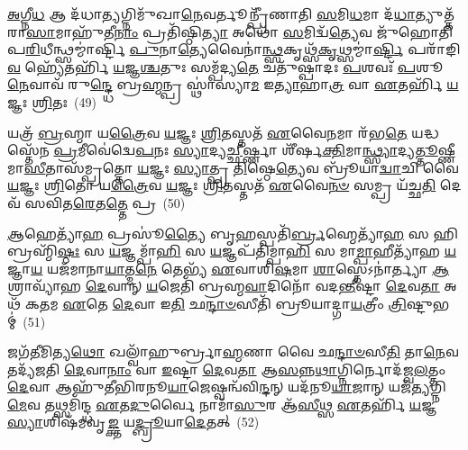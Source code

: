 {\anuvakamend[{\-\ul{𑌪𑍍𑌰𑌾}\-\-\ul{𑌶𑍍𑌞𑍀}\-𑌯𑌾𑌦𑍍𑌧𑍋𑌤𑌾᳴ \ul{𑌯}\-𑌜𑍍𑌞𑌂 𑌨𑌿𑌰᳴𑌹\-\ul{𑌰}\-𑌨𑍍𑌤𑌚𑍍𑌚𑌕𑍍𑌷𑍁᳴\-\ul{𑌰𑌾}\-𑌸𑍍𑌯᳴𑌙𑍍𑌕𑌿𑌂 \ul{𑌚}\-𑌨 \ul{𑌹𑌿}\-𑌨\-\ul{𑌸𑍍𑌤𑌿} 𑌸𑍋᳴\-𑌽𑌬𑌿\-\ul{𑌭𑍇}\-𑌚𑍍𑌚𑌤𑍁᳴𑌶𑍍𑌚𑌤𑍍𑌵𑌾𑌰𑌿𑍞𑌶𑌚𑍍𑌚}]}%

\-\ul{𑌅}\-𑌗𑍍𑌨𑍀\-\ul{𑌧} 𑌆 𑌦᳴𑌧𑌾\-\ul{𑌤𑍍𑌯}\-𑌗𑍍𑌨𑌿𑌮𑍁᳴𑌖𑌾\-\ul{𑌨𑍇}\-𑌵𑌰𑍍𑌤𑍂𑌨𑍍𑌪𑍍𑌰𑍀᳴𑌣𑌾𑌤𑌿 \ul{𑌸}\-𑌮𑌿\-\ul{𑌧}\-𑌮𑌾 𑌦᳴\-\ul{𑌧𑌾}\-𑌤𑍍𑌯𑍁𑌤𑍍𑌤᳴𑌰𑌾\-\ul{𑌸𑌾}\-𑌮𑌾𑌹𑍁᳴𑌤𑍀\-\ul{𑌨𑌾𑌂} 𑌪𑍍𑌰𑌤𑌿᳴𑌷𑍍𑌠𑌿\-\ul{𑌤𑍍𑌯𑌾} 𑌅𑌥𑍋᳴ \ul{𑌸}\-𑌮𑌿𑌦𑍍𑌵᳴\-\ul{𑌤𑍍𑌯𑍇}\-𑌵 𑌜𑍁᳴𑌹𑍋𑌤𑌿 𑌪\-\ul{𑌰𑌿}\-𑌧𑍀𑌨𑍍𑌥𑍍𑌸𑌮𑍍𑌮𑌾॑𑌰𑍍𑌷𑍍𑌟𑌿 \ul{𑌪𑍁}\-𑌨𑌾\-\ul{𑌤𑍍𑌯𑍇}\-𑌵𑍈𑌨𑌾॑\-\ul{𑌨𑍍𑌥𑍍𑌸}\-𑌕𑍃𑌥𑍍𑌸᳴\-\ul{𑌕𑍃}\-𑌥𑍍𑌸𑌮𑍍𑌮𑌾॑\-\ul{𑌰𑍍𑌷𑍍𑌟𑌿} 𑌪𑌰𑌾᳴𑌙𑌿\-\ul{𑌵} 𑌹𑍍𑌯𑍇᳴𑌤𑌰𑍍\mbox{}𑌹𑌿᳴ \ul{𑌯}\-𑌜𑍍𑌞\-\ul{𑌶𑍍𑌚}\-𑌤𑍁𑌃 𑌸𑌮𑍍𑌪᳴𑌦𑍍𑌯\-\ul{𑌤𑍇} 𑌚𑌤𑍁᳴𑌷𑍍𑌪𑌾𑌦𑌃 \ul{𑌪}\-𑌶𑌵𑌃᳴ \ul{𑌪}\-𑌶𑍂\-\ul{𑌨𑍇}\-𑌵𑌾𑌵᳴ 𑌰𑍁\-\ul{𑌨𑍍𑌦𑍍𑌧𑍇} 𑌬𑍍𑌰\-\ul{𑌹𑍍𑌮}\-𑌨𑍍𑌪𑍍𑌰 𑌸𑍍𑌥𑌾॑𑌸𑍍𑌯𑌾\-\ul{𑌮} 𑌇\-\ul{𑌤𑍍𑌯𑌾}\-𑌹𑌾\-\ul{𑌤𑍍𑌰} 𑌵𑌾 \ul{𑌏}\-𑌤𑌰𑍍\mbox{}𑌹𑌿᳴ \ul{𑌯}\-𑌜𑍍𑌞𑌃 \ul{𑌶𑍍𑌰𑌿}\-𑌤𑌃~(49)

𑌯𑌤𑍍𑌰᳴ \ul{𑌬𑍍𑌰}\-𑌹𑍍𑌮𑌾 𑌯\-\ul{𑌤𑍍𑌰𑍈}\-𑌵 \ul{𑌯}\-𑌜𑍍𑌞𑌃 \ul{𑌶𑍍𑌰𑌿}\-𑌤𑌸𑍍𑌤𑌤᳴ \ul{𑌏}\-𑌵𑍈\-\ul{𑌨}\-𑌮𑌾 𑌰᳴𑌭\-\ul{𑌤𑍇} 𑌯𑌦𑍍𑌧𑌸𑍍𑌤𑍇᳴𑌨 \ul{𑌪𑍍𑌰}\-𑌮𑍀𑌵𑍇॑𑌦𑍍𑌵𑍇\-\ul{𑌪}\-𑌨𑌃 \ul{𑌸𑍍𑌯𑌾}\-𑌦𑍍𑌯\-\ul{𑌚𑍍𑌛𑍀}\-𑌰𑍍𑌷𑍍𑌣𑌾 𑌶𑍀᳴𑌰𑍍\mbox{}𑌷\-\ul{𑌕𑍍𑌤𑌿}\-𑌮𑌾\-\ul{𑌨𑍍𑌥𑍍𑌸𑍍𑌯𑌾}\-𑌦𑍍𑌯\-\ul{𑌤𑍍𑌤𑍂}\-𑌷𑍍𑌣𑍀𑌮𑌾\-\ul{𑌸𑍀}\-𑌤𑌾𑌸᳴𑌮𑍍𑌪𑍍𑌰𑌤𑍍𑌤𑍋 \ul{𑌯}\-𑌜𑍍𑌞𑌃 \ul{𑌸𑍍𑌯𑌾}\-𑌤𑍍𑌪𑍍𑌰 \ul{𑌤𑌿}\-𑌷𑍍𑌠𑍇\-\ul{𑌤𑍍𑌯𑍇}\-𑌵 𑌬𑍍𑌰𑍂᳴𑌯𑌾\-\ul{𑌦𑍍𑌵𑌾}\-𑌚𑌿 𑌵𑍈 \ul{𑌯}\-𑌜𑍍𑌞𑌃 \ul{𑌶𑍍𑌰𑌿}\-𑌤𑍋 𑌯\-\ul{𑌤𑍍𑌰𑍈}\-𑌵 \ul{𑌯}\-𑌜𑍍𑌞𑌃 \ul{𑌶𑍍𑌰𑌿}\-𑌤𑌸𑍍𑌤𑌤᳴ \ul{𑌏}\-𑌵𑍈\-\ul{𑌨}\-\-\ul{𑍞} 𑌸𑌮𑍍𑌪𑍍𑌰 𑌯᳴𑌚𑍍𑌛\-\ul{𑌤𑌿} 𑌦𑍇𑌵᳴ 𑌸𑌵𑌿𑌤\-\ul{𑌰𑍇}\-𑌤\-\ul{𑌤𑍍𑌤𑍇} 𑌪𑍍𑌰~(50)

\-\ul{𑌆}\-𑌹𑍇𑌤𑍍𑌯𑌾᳴\-\ul{𑌹} 𑌪𑍍𑌰𑌸𑍂॑\-\ul{𑌤𑍍𑌯𑍈} 𑌬𑍃\-\ul{𑌹}\-𑌸𑍍𑌪𑌤𑌿᳴\-\ul{𑌰𑍍𑌬𑍍𑌰}\-𑌹𑍍𑌮𑍇𑌤𑍍𑌯𑌾᳴\-\ul{𑌹} 𑌸 𑌹𑌿 𑌬𑍍𑌰𑌹𑍍𑌮𑌿᳴\-\ul{𑌷𑍍𑌠𑌃} 𑌸 \ul{𑌯}\-𑌜𑍍𑌞𑌮𑍍𑌪𑌾᳴\-\ul{𑌹𑌿} 𑌸 \ul{𑌯}\-𑌜𑍍𑌞𑌪᳴𑌤𑌿𑌮𑍍𑌪𑌾\-\ul{𑌹𑌿} 𑌸 𑌮𑌾\-\ul{𑌮𑍍𑌪𑌾}\-𑌹𑍀𑌤𑍍𑌯𑌾᳴𑌹 \ul{𑌯}\-𑌜𑍍𑌞𑌾\-\ul{𑌯} 𑌯𑌜᳴𑌮𑌾𑌨𑌾\-\ul{𑌯𑌾}\-𑌤𑍍𑌮\-\ul{𑌨𑍇} 𑌤𑍇𑌭𑍍𑌯᳴ \ul{𑌏}\-𑌵𑌾𑌶𑌿\-\ul{𑌷}\-𑌮𑌾 \ul{𑌶𑌾}\-𑌸𑍍𑌤𑍇\-𑌽𑌨𑌾॑𑌰𑍍𑌤𑍍𑌯𑌾 \ul{𑌆}\-𑌶𑍍𑌰𑌾𑌵𑍍𑌯𑌾᳴𑌹 \ul{𑌦𑍇}\-𑌵𑌾𑌨𑍍 \ul{𑌯}\-𑌜𑍇𑌤𑌿᳴ 𑌬𑍍𑌰𑌹𑍍𑌮\-\ul{𑌵𑌾}\-𑌦𑌿𑌨𑍋᳴ 𑌵𑌦\-\ul{𑌨𑍍𑌤𑍀}\-𑌷𑍍𑌟𑌾 \ul{𑌦𑍇}\-𑌵\-\ul{𑌤𑌾} 𑌅𑌥᳴ 𑌕\-\ul{𑌤}\-𑌮 \ul{𑌏}\-𑌤𑍇 \ul{𑌦𑍇}\-𑌵𑌾 𑌇\-\ul{𑌤𑌿} 𑌛\-\ul{𑌨𑍍𑌦𑌾}\-\-\ul{𑍞}\-𑌸𑍀𑌤𑌿᳴ 𑌬𑍍𑌰𑍂𑌯𑌾𑌦𑍍𑌗𑌾\-\ul{𑌯}\-𑌤𑍍𑌰𑍀𑌂 \ul{𑌤𑍍𑌰𑌿}\-𑌷𑍍𑌟𑍁𑌭𑌮𑍍॑~(51)

𑌜𑌗᳴\-\ul{𑌤𑍀}\-𑌮𑌿𑌤𑍍𑌯\-\ul{𑌥𑍋} 𑌖𑌲𑍍𑌵𑌾᳴𑌹𑍁𑌰𑍍𑌬𑍍𑌰𑌾\-\ul{𑌹𑍍𑌮}\-𑌣𑌾 𑌵𑍈 𑌛\-\ul{𑌨𑍍𑌦𑌾}\-\-\ul{𑍞}\-𑌸𑍀\-\ul{𑌤𑌿} 𑌤𑌾\-\ul{𑌨𑍇}\-𑌵 𑌤𑌦𑍍𑌯᳴𑌜𑌤𑌿 \ul{𑌦𑍇}\-𑌵𑌾\-\ul{𑌨𑌾𑌂} 𑌵𑌾 \ul{𑌇}\-𑌷𑍍𑌟𑌾 \ul{𑌦𑍇}\-𑌵\-\ul{𑌤𑌾} 𑌆\-\ul{𑌸}\-𑌨𑍍𑌨\-\ul{𑌥𑌾}\-𑌗𑍍𑌨𑌿𑌰𑍍𑌨𑍋𑌦᳴𑌜𑍍𑌵\-\ul{𑌲}\-𑌤𑍍𑌤𑌂 \ul{𑌦𑍇}\-𑌵𑌾 𑌆𑌹𑍁᳴𑌤𑍀𑌭𑌿𑌰𑌨𑍂\-\ul{𑌯𑌾}\-𑌜𑍇𑌷𑍍𑌵𑌨𑍍𑌵᳴𑌵𑌿\-\ul{𑌨𑍍𑌦}\-𑌨𑍍 𑌯𑌦᳴𑌨𑍂\-\ul{𑌯𑌾}\-𑌜𑌾𑌨𑍍 𑌯𑌜᳴\-\ul{𑌤𑍍𑌯}\-𑌗𑍍𑌨𑌿\-\ul{𑌮𑍇}\-𑌵 𑌤𑌥𑍍𑌸𑌮𑌿᳴𑌨𑍍𑌦𑍍𑌧 \ul{𑌏}\-𑌤\-\ul{𑌦𑍁}\-𑌰𑍍𑌵𑍈 𑌨𑌾𑌮𑌾᳴\-\ul{𑌸𑍁}\-𑌰 𑌆᳴\-\ul{𑌸𑍀}\-𑌥𑍍𑌸 \ul{𑌏}\-𑌤𑌰𑍍\mbox{}𑌹𑌿᳴ \ul{𑌯}\-𑌜𑍍𑌞\-\ul{𑌸𑍍𑌯𑌾}\-𑌶𑌿𑌷᳴𑌮𑌵𑍃\-\ul{𑌙𑍍𑌕𑍍𑌤} 𑌯\-\ul{𑌦𑍍𑌬𑍍𑌰𑍂}\-𑌯𑌾\-\ul{𑌦𑍇}\-𑌤𑌤𑍍~(52)

